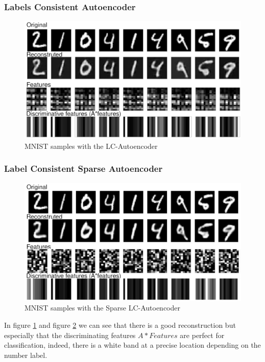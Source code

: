 \subsubsection{Labels Consistent Autoencoder}
\begin{figure}[h]
 \centering
 \includegraphics[scale=0.3]{LCAE.png}
 \caption{MNIST samples with the  LC-Autoencoder}
 \label{fig:LCAE}
\end{figure}
\subsubsection{Label Consistent Sparse Autoencoder}
\begin{figure}[h]
 \centering
 \includegraphics[scale=0.3]{Sparse-LCAE.png}
 \caption{MNIST samples with the Sparse LC-Autoencoder}
 \label{fig:SLCAE}
\end{figure}
In figure \ref{fig:LCAE} and figure \ref{fig:SLCAE} we can see that there is a good reconstruction but especially that the discriminating features $A*Features$ are perfect for classification, indeed, there is a white band at a precise location depending on the number label.
